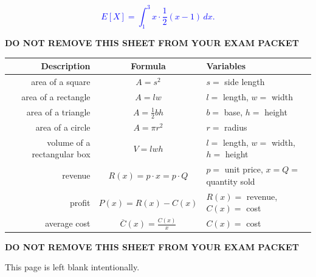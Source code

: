 \documentclass[11pt]{article}
\begin{document}
\begin{enumerate}
\begin{enumerate}[i]
\vspace{0.3cm}
\textcolor{blue}{
\[
E[X] = \int_{1}^{3} x \cdot \frac{1}{2}(x-1)\,dx.
\]
}
\end{enumerate}



\newpage

\begin{center}
{\bf DO NOT REMOVE THIS SHEET FROM YOUR EXAM PACKET}
\end{center}

\begin{center}
    \begin{tabular}{ r | c | l }
    {\bf Description} & {\bf Formula} & {\bf Variables}\\
    \hline
    area of a square & $A=s^2$ & $s=$ side length\\
    \hline
    area of a rectangle & $A=lw$ & $l=$ length, $w=$ width\\
    \hline
    area of a triangle & $A=\frac12bh$ & $b=$ base, $h=$ height\\
    \hline
    area of a circle & $A=\pi r^2$ & $r=$ radius\\
    \hline
    volume of a rectangular box & $V=lwh$ & $l=$ length, $w=$ width, $h=$ height\\
    \hline
    revenue & $R(x) = p\cdot x = p\cdot Q$ & $p=$ unit price, $x=Q=$ quantity sold\\
    \hline
    profit & $P(x) = R(x) - C(x)$ & $R(x)=$ revenue, $C(x)=$ cost\\
    \hline
    average cost & $\overline C(x) = \frac{C(x)}{x}$ & $C(x)=$ cost\\
    \end{tabular}
\end{center}

\begin{center}
{\bf DO NOT REMOVE THIS SHEET FROM YOUR EXAM PACKET}
\end{center}

\newpage

This page is left blank intentionally.\\


\end{enumerate}
\end{document}

